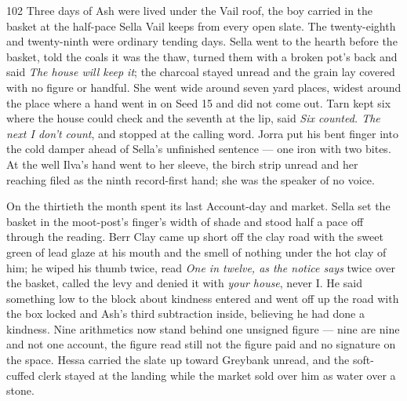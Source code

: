 
\scenebreak


\scenebreak


\scenebreak

\CRtailpiece
\begin{CRchronicle}{102}
Three days of Ash were lived under the Vail roof, the boy carried in the basket at the half-pace Sella Vail keeps from every open slate. The twenty-eighth and twenty-ninth were ordinary tending days. Sella went to the hearth before the basket, told the coals it was the thaw, turned them with a broken pot’s back and said \emph{The house will keep it}; the charcoal stayed unread and the grain lay covered with no figure or handful. She went wide around seven yard places, widest around the place where a hand went in on Seed 15 and did not come out. Tarn kept six where the house could check and the seventh at the lip, said \emph{Six counted. The next I don’t count}, and stopped at the calling word. Jorra put his bent finger into the cold damper ahead of Sella’s unfinished sentence --- one iron with two bites. At the well Ilva’s hand went to her sleeve, the birch strip unread and her reaching filed as the ninth record-first hand; she was the speaker of no voice.

On the thirtieth the month spent its last Account-day and market. Sella set the basket in the moot-post’s finger’s width of shade and stood half a pace off through the reading. Berr Clay came up short off the clay road with the sweet green of lead glaze at his mouth and the smell of nothing under the hot clay of him; he wiped his thumb twice, read \emph{One in twelve, as the notice says} twice over the basket, called the levy and denied it with \emph{your house}, never I. He said something low to the block about kindness entered and went off up the road with the box locked and Ash’s third subtraction inside, believing he had done a kindness. Nine arithmetics now stand behind one unsigned figure --- nine are nine and not one account, the figure read still not the figure paid and no signature on the space. Hessa carried the slate up toward Greybank unread, and the soft-cuffed clerk stayed at the landing while the market sold over him as water over a stone.


\end{CRchronicle}

